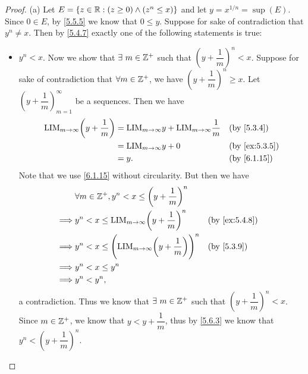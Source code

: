 \begin{proof}{(a)}
  Let \(E = \{z \in \mathbb{R} : (z \geq 0) \land (z^n \leq x)\}\) and let \(y = x^{1 / n} = \sup(E)\).
  Since \(0 \in E\), by \cref{5.5.5} we know that \(0 \leq y\).
  Suppose for sake of contradiction that \(y^n \neq x\).
  Then by \cref{5.4.7} exactly one of the following statements is true:
  \begin{itemize}
    \item \(y^n < x\).
          Now we show that \(\exists\ m \in \mathbb{Z}^+\) such that \((y + \dfrac{1}{m})^n < x\).
          Suppose for sake of contradiction that \(\forall m \in \mathbb{Z}^+\), we have \((y + \dfrac{1}{m})^n \geq x\).
          Let \((y + \dfrac{1}{m})_{m = 1}^\infty\) be a sequences.
          Then we have
          \begin{align*}
            \text{LIM}_{m \to \infty} \bigg(y + \dfrac{1}{m}\bigg) & = \text{LIM}_{m \to \infty} y + \text{LIM}_{m \to \infty} \dfrac{1}{m} &  & \by{5.3.4}                  \\
                                                                   & = \text{LIM}_{m \to \infty} y + 0                                      &  & \text{(by \cref{ex:5.3.5})} \\
                                                                   & = y.                                                                   &  & \text{(by \cref{6.1.15})}
          \end{align*}
          Note that we use \cref{6.1.15} without circularity.
          But then we have
          \begin{align*}
                     & \forall m \in \Z^+, y^n < x \leq \bigg(y + \dfrac{1}{m}\bigg)^n                                                    \\
            \implies & y^n < x \leq \text{LIM}_{m \to \infty} \bigg(y + \dfrac{1}{m}\bigg)^n             &  & \text{(by \cref{ex:5.4.8})} \\
            \implies & y^n < x \leq \Bigg(\text{LIM}_{m \to \infty} \bigg(y + \dfrac{1}{m}\bigg)\Bigg)^n &  & \by{5.3.9}                  \\
            \implies & y^n < x \leq y^n                                                                                                   \\
            \implies & y^n < y^n,
          \end{align*}
          a contradiction.
          Thus we know that \(\exists\ m \in \mathbb{Z}^+\) such that \((y + \dfrac{1}{m})^n < x\).
          Since \(m \in \mathbb{Z}^+\), we know that \(y < y + \dfrac{1}{m}\), thus by \cref{5.6.3} we know that \(y^n < (y + \dfrac{1}{m})^n\).

\end{itemize}
\end{proof}

